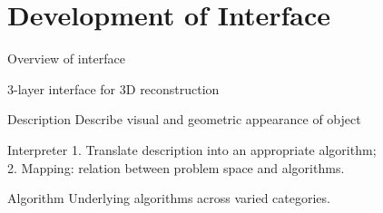 \documentclass[10pt]{beamer}
\begin{document}
\section{Development of Interface}
\begin{frame}{Overview of interface}

\begin{exampleblock}{3-layer interface for 3D reconstruction}
\end{exampleblock}

\begin{figure}
\centering
{}
\end{figure}

\begin{exampleblock}{Description}
  Describe visual and geometric appearance of object
\end{exampleblock}
\begin{exampleblock}{Interpreter}
  1. Translate description into an appropriate algorithm; \\
  2. Mapping: relation between problem space and algorithms.
\end{exampleblock}
\begin{exampleblock}{Algorithm}
  Underlying algorithms across varied categories.
\end{exampleblock}

\end{frame}

\end{document}
